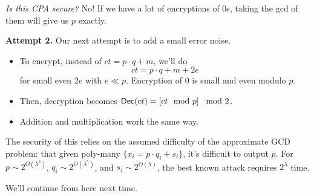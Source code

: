\emph{Is this CPA secure?} No! If we have a lot of encryptions of $0$s, taking the gcd of them will give us $p$ exactly.

\textbf{Attempt 2.} Our next attempt is to add a small error noise.

\begin{itemize}
    \item To encrypt, instead of $ct = p\cdot q + m$, we'll do
          \[ct = p\cdot q + m + 2e\]
          for small even $2e$ with $e \ll p$. Encryption of $0$ is small and even modulo $p$.
    \item Then, decryption becomes $\operatorname{\mathsf{Dec}}(ct) = \left[ ct\mod p \right]\mod 2$.
    \item Addition and multiplication work the same way.
\end{itemize}

The security of this relies on the assumed difficulty of the approximate GCD problem: that given poly-many $\{x_i = p\cdot q_i + s_i\}$, it's difficult to output $p$. For $p\sim 2^{O(\lambda^2)}$, $q_i\sim 2^{O(\lambda^5)}$, and $s_i\sim 2^{O(\lambda)}$, the best known attack requires $2^\lambda$ time.

We'll continue from here next time.